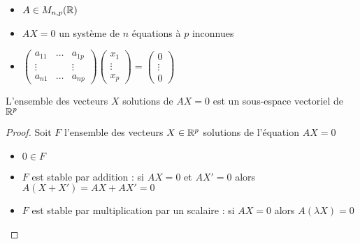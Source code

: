 \begin{frame}

\begin{itemize}
  \item $A \in M_{n,p}(\mathbb{R})$
  \item $AX = 0$ un système de $n$ équations à $p$ inconnues
  \item $  \left(
\begin{array}{lcl}
a_{11} & \dots & a_{1p}\\
\vdots &&\vdots\\
a_{n1} & \dots & a_{np}
\end{array}\right)
  \left(
\begin{array}{c}
x_1 \\ \vdots\\x_p
\end{array}\right) =   \left(
\begin{array}{c}
0\\ \vdots \\ 0
\end{array}\right)
$
\end{itemize}

\pause

\begin{theoreme}
\label{th:axsev}
L'ensemble des vecteurs $X$ solutions de $AX=0$ est un sous-espace vectoriel de $\mathbb{R}^p$
\end{theoreme}

\pause

\begin{proof}
Soit $F$ l'ensemble des vecteurs $X \in \mathbb{R}^p$ solutions de l'équation $AX=0$
\begin{itemize}
  \item $0 \in F$
  \item $F$ est stable par addition : si $AX = 0$ et $AX' = 0$ alors $A(X + X') = AX + AX' = 0$
  \item  $F$ est stable par multiplication par un scalaire : si $AX=0$ alors $A (\lambda X) = 0$ \qedhere
\end{itemize}
\end{proof}
 

\end{frame}


